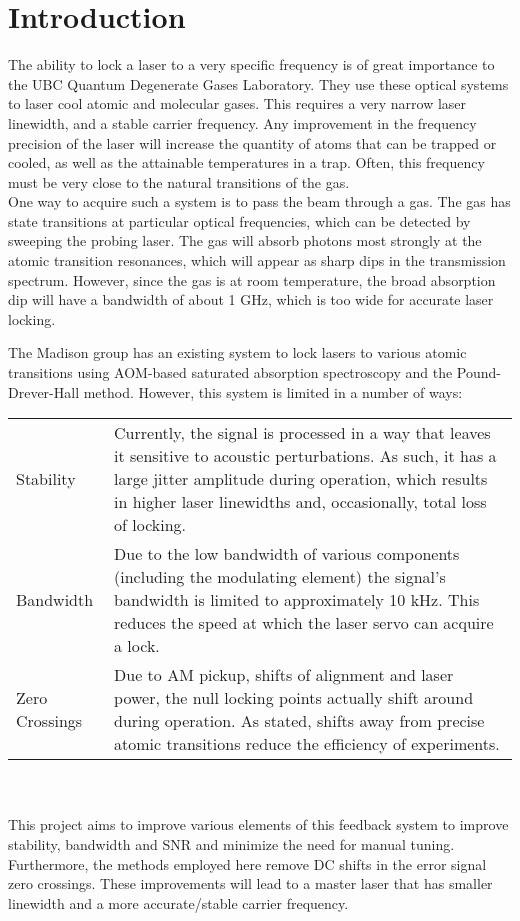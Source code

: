 \newpage
\section{Introduction}

The ability to lock a laser to a very specific frequency is of great importance to the UBC Quantum Degenerate Gases Laboratory.  They use these optical systems to laser cool atomic and molecular gases.  This requires a very narrow laser linewidth, and a stable carrier frequency.  Any improvement in the frequency precision of the laser will increase the quantity of atoms that can be trapped or cooled, as well as the attainable temperatures in a trap.  Often, this frequency must be very close to the natural transitions of the gas. \\

One way to acquire such a system is to pass the beam through a gas.  The gas has state transitions at particular optical frequencies, which can be detected by sweeping the probing laser. The gas will absorb photons most strongly at the atomic transition resonances, which will appear as sharp dips in the transmission spectrum.  However, since the gas is at room temperature, the broad absorption dip will have a bandwidth of about 1 GHz, which is too wide for accurate laser locking.

The Madison group has an existing system to lock lasers to various atomic transitions using AOM-based saturated absorption spectroscopy and the Pound-Drever-Hall method. However, this system is limited in a number of ways: \\
\begin{tabularx}{\linewidth}{lX}
  Stability & Currently, the signal is processed in a way that leaves it sensitive to acoustic perturbations. As such, it has a large jitter amplitude during operation, which results in higher laser linewidths and, occasionally, total loss of locking. \\
  Bandwidth & Due to the low bandwidth of various components (including the modulating element) the signal's bandwidth is limited to approximately 10 kHz. This reduces the speed at which the laser servo can acquire a lock. \\
  Zero Crossings & Due to AM pickup, shifts of alignment and laser power, the null locking points actually shift around during operation. As stated, shifts away from precise atomic transitions reduce the efficiency of experiments.
\end{tabularx} \\ \ \\
This project aims to improve various elements of this feedback system to improve stability, bandwidth and SNR and minimize the need for manual tuning. Furthermore, the methods employed here remove DC shifts in the error signal zero crossings. These improvements will lead to a master laser that has smaller linewidth and a more accurate/stable carrier frequency.

